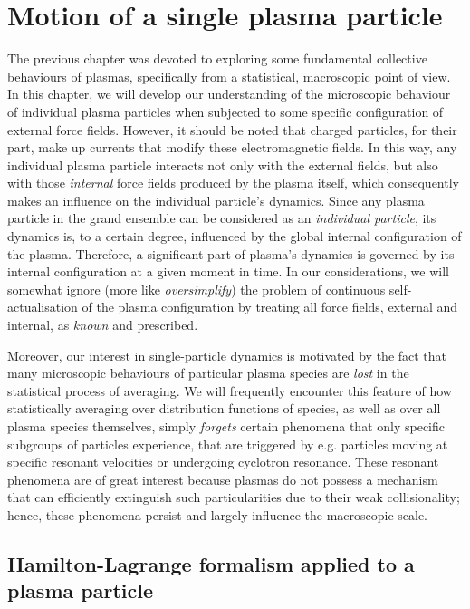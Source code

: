 
\chapter{Motion of a single plasma particle}

The previous chapter was devoted to exploring some fundamental collective behaviours of plasmas, specifically from a statistical, macroscopic point of view. In this chapter, we will develop our understanding of the microscopic behaviour of individual plasma particles when subjected to some specific configuration of external force fields. However, it should be noted that charged particles, for their part, make up currents that modify these electromagnetic fields. In this way, any individual plasma particle interacts not only with the external fields, but also with those \textit{internal} force fields produced by the plasma itself, which consequently makes an influence on the individual particle's dynamics. Since any plasma particle in the grand ensemble can be considered as an \textit{individual particle}, its dynamics is, to a certain degree, influenced by the global internal configuration of the plasma. Therefore, a significant part of plasma's dynamics is governed by its internal configuration at a given moment in time. In our considerations, we will somewhat ignore (more like \textit{oversimplify}) the problem of continuous self-actualisation of the plasma configuration by treating all force fields, external and internal, as \textit{known} and prescribed.

\quad Moreover, our interest in single-particle dynamics is motivated by the fact that many microscopic behaviours of particular plasma species are \textit{lost} in the statistical process of averaging. We will frequently encounter this feature of how statistically averaging over distribution functions of species, as well as over all plasma species themselves, simply \textit{forgets} certain phenomena that only specific subgroups of particles experience, that are triggered by e.g. particles moving at specific resonant velocities or undergoing cyclotron resonance. These resonant phenomena are of great interest because plasmas do not possess a mechanism that can efficiently extinguish such particularities due to their weak collisionality; hence, these phenomena persist and largely influence the macroscopic scale. 

\section{Hamilton-Lagrange formalism applied to a plasma particle}

